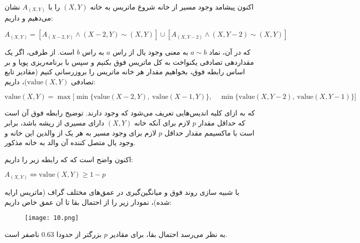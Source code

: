 \documentclass{scribe-cgenomics}
\begin{document}
اکنون پیشامد وجود مسیر از خانه شروع ماتریس به خانه
$(X,Y)$
را با
$A_{(X,Y)}$
نشان می‌دهیم و داریم:

\begin{center}
$
A_{(X,Y)} = [A_{(X-2,Y)} \land (X-2,Y)\sim (X,Y)] \cup [A_{(X,Y-2)} \land (X,Y-2)\sim (X,Y)]
$
\end{center}

که در آن، نماد
$a\sim b$
به معنی وجود یال از راس
$a$
به راس
$b$
است. از طرفی، اگر یک مقداردهی تصادفی یکنواخت به کل ماتریس فوق بکنیم و سپس با برنامه‌ریزی پویا و بر اساس رابطه فوق، بخواهیم مقدار هر خانه ماتریس را بروزرسانی کنیم (مقادیر تابع تصادفی
$\text{value}(X,Y)$)،
داریم:

\begin{center}
$
\text{value}{(X,Y)} = \max \big[
\min \{ \text{value}(X-2,Y),\  \text{value}(X-1,Y)\},\quad 
\min \{ \text{value}(X,Y-2),\  \text{value}(X,Y-1)\}
\big]
$
\end{center}

که به ازای کلیه اندیس‌هایی تعریف می‌شود که وجود دارند. توضیح رابطه فوق آن است که حداقل مقدار
$p$
لازم برای آنکه خانه
$(X,Y)$
دارای مسیری از ریشه باشد، برابر است با ماکسیمم مقدار حداقل
$p$
لازم برای وجود مسیر به هر یک از والدین این خانه و وجود یال متصل کننده آن والد به خانه مذکور.

اکنون واضح است که که رابطه زیر را داریم:

\begin{center}
$A_{(X,Y)} \iff \text{value}(X,Y) \geq 1-p$
\end{center}

با شبیه سازی روند فوق و میانگین‌گیری در عمق‌های مختلف گراف (ماتریس ارایه شده)، نمودار زیر را از احتمال بقا تا آن عمق خاص داریم:

\begin{figure}[h]\label{10}
\texttt{[image: 10.png]}
\centering
\end{figure}

به نظر می‌رسد احتمال بقا، برای مقادیر
$p$
بزرگتر از حدودا
$0.63$
ناصفر است.





\end{document}
